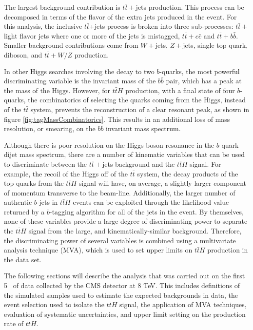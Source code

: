 \par The largest background contribution is $t\bar{t}+$jets
production.  This process can be decomposed in terms of the flavor of
the extra jets produced in the event.  For this analysis, the
inclusive $t\bar{t}$+jets process is broken into three sub-processes:
$t\bar{t}+$ light flavor jets where one or more 
of the jets is mistagged, $t\bar{t}+c\bar{c}$ and $t\bar{t}+b\bar{b}$.
Smaller background contributions come from $W+$jets, $Z+$jets, single
top quark, diboson, and $t\bar{t}+W/Z$ production.  

\par In other Higgs searches involving the decay to two $b$-quarks,
the most powerful discriminating variable is the invariant mass of the
$b\bar{b}$ pair, which has a peak at the mass of the Higgs.  However, for
$t\bar{t}H$ production, with a final state of four $b$-quarks, the
combinatorics of selecting the quarks coming from the Higgs, instead
of the $t\bar{t}$ system, prevents the reconstruction of a clear
resonant peak, as shown in figure \ref{fig:tagMassCombinatorics}.
This results in an additional loss of mass resolution, or smearing,
on the $b\bar{b}$ invariant mass spectrum. 

\par Although there is poor resolution on the Higgs boson resonance in
the $b$-quark dijet mass spectrum, there are a number of kinematic
variables that can be used to discriminate between the $t\bar{t}+$jets
background and the $t\bar{t}H$ signal.  For example, the recoil of
the Higgs off of the $t\bar{t}$ system, the decay products of the top
quarks from the $t\bar{t}H$ signal will have, on average, a slightly
larger component of momentum transverse to the beam-line.
Additionally, the larger number of authentic $b$-jets in $t\bar{t}H$
events can be exploited through the likelihood value returned by a
$b$-tagging algorithm for all of the jets in the event.  By
themselves, none of these variables provide a large degree of
discriminating power to separate the $t\bar{t}H$ signal from the
large, and kinematically-similar background.  Therefore, the
discriminating power of several variables is combined using a
multivariate analysis technique (MVA), which is used to set upper
limits on $t\bar{t}H$ production in the data set. 

\par The following sections will describe the analysis that was
carried out on the first 5 \fbinv~of data collected by the CMS
detector at 8 TeV.  This includes definitions of the simulated samples used to
estimate the expected backgrounds in data, the event selection used to
isolate the $t\bar{t}H$ signal, the application of MVA techniques,
evaluation of systematic uncertainties, and upper limit setting on the
production rate of $t\bar{t}H$. 


